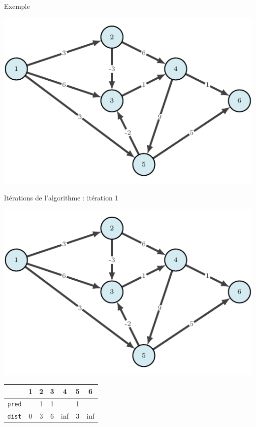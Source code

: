 \begin{frame}{Exemple}
    \begin{center}
        \includegraphics[height=.6\textheight]{fig/bellman-0.pdf}

    \end{center}
\end{frame}

\begin{frame}{Itérations de l'algorithme : itération 1}
    \begin{center}
        \includegraphics[height=.6\textheight]{fig/bellman-0.pdf}      
    \begin{tabular}{c|cccccc}
      
        & 1    &2      &3      &4      &5      &6      \\
        \hline
        \texttt{pred} & &1      &1      &       &1      &       \\
        \texttt{dist} & 0       &3      &6      &inf    &3      &inf    \\

    \end{tabular}
\end{center}
\end{frame}

